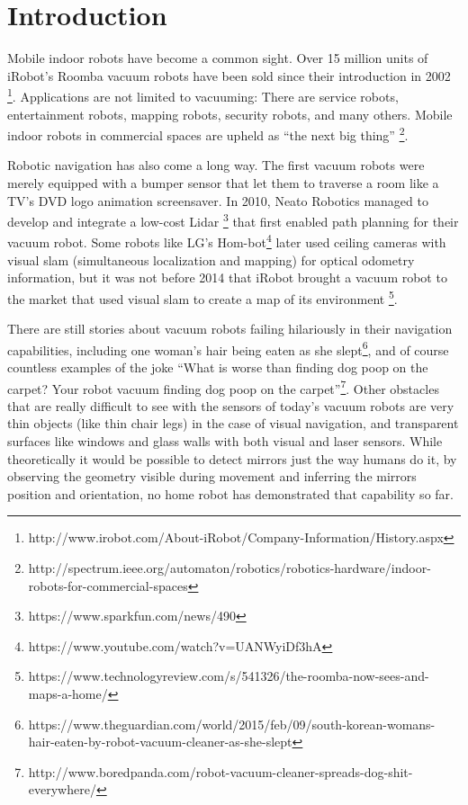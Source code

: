 \chapter{Introduction}\label{introduction}

Mobile indoor robots have become a common sight. Over 15 million units
of iRobot's Roomba vacuum robots have been sold since their introduction
in 2002
\footnote{http://www.irobot.com/About-iRobot/Company-Information/History.aspx}.
Applications are not limited to vacuuming: There are service robots,
entertainment robots, mapping robots, security robots, and many others.
Mobile indoor robots in commercial spaces are upheld as ``the next big
thing''
\footnote{http://spectrum.ieee.org/automaton/robotics/robotics-hardware/indoor-robots-for-commercial-spaces}.

Robotic navigation has also come a long way. The first vacuum robots
were merely equipped with a bumper sensor that let them to traverse a
room like a TV's DVD logo animation screensaver. In 2010, Neato Robotics
managed to develop and integrate a low-cost Lidar
\footnote{https://www.sparkfun.com/news/490} that first enabled path
planning for their vacuum robot. Some robots like LG's
Hom-bot\footnote{https://www.youtube.com/watch?v=UANWyiDf3hA} later used
ceiling cameras with visual slam (simultaneous localization and mapping)
for optical odometry information, but it was not before 2014 that iRobot
brought a vacuum robot to the market that used visual slam to create a
map of its environment
\footnote{https://www.technologyreview.com/s/541326/the-roomba-now-sees-and-maps-a-home/}.

There are still stories about vacuum robots failing hilariously in their
navigation capabilities, including one woman's hair being eaten as she
slept\footnote{https://www.theguardian.com/world/2015/feb/09/south-korean-womans-hair-eaten-by-robot-vacuum-cleaner-as-she-slept},
and of course countless examples of the joke ``What is worse than
finding dog poop on the carpet? Your robot vacuum finding dog poop on
the
carpet''\footnote{http://www.boredpanda.com/robot-vacuum-cleaner-spreads-dog-shit-everywhere/}.
Other obstacles that are really difficult to see with the sensors of
today's vacuum robots are very thin objects (like thin chair legs) in
the case of visual navigation, and transparent surfaces like windows and
glass walls with both visual and laser sensors. While theoretically it
would be possible to detect mirrors just the way humans do it, by
observing the geometry visible during movement and inferring the mirrors
position and orientation, no home robot has demonstrated that capability
so far.

